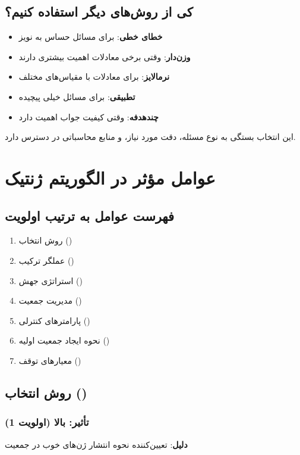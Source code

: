 \documentclass[12pt,a4paper]{article}
\begin{document}
	\subsection{کی از روش‌های دیگر استفاده کنیم؟}
	
	\begin{itemize}
		\item \textbf{خطای خطی}: برای مسائل حساس به نویز
		\item \textbf{وزن‌دار}: وقتی برخی معادلات اهمیت بیشتری دارند
		\item \textbf{نرمالایز}: برای معادلات با مقیاس‌های مختلف
		\item \textbf{تطبیقی}: برای مسائل خیلی پیچیده
		\item \textbf{چندهدفه}: وقتی کیفیت جواب اهمیت دارد
	\end{itemize}
	
	این انتخاب بستگی به نوع مسئله، دقت مورد نیاز، و منابع محاسباتی در دسترس دارد.
	
	\section{عوامل مؤثر در الگوریتم ژنتیک}
	
	\subsection{فهرست عوامل به ترتیب اولویت}
	
	\begin{enumerate}
		\item روش انتخاب ()
		\item عملگر ترکیب ()
		\item استراتژی جهش ()
		\item مدیریت جمعیت ()
		\item پارامترهای کنترلی ()
		\item نحوه ایجاد جمعیت اولیه ()
		\item معیارهای توقف ()
	\end{enumerate}
	
	\subsection{روش انتخاب ()}
	
	\subsubsection{تأثیر: \textbf{بالا} (اولویت 1)}
	\textbf{دلیل}: تعیین‌کننده نحوه انتشار ژن‌های خوب در جمعیت
	
\end{document}
